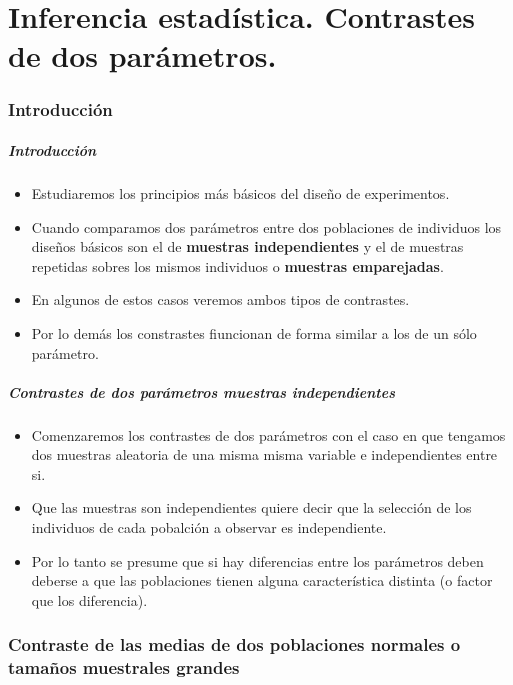 \part{Inferencia estadística. Contrastes de dos parámetros.}
\section{Introducción}

\begin{frame}
\frametitle{Introducción}

\begin{itemize}
\item Estudiaremos los principios más básicos del diseño de experimentos.
\item  Cuando comparamos dos parámetros entre dos poblaciones de individuos los diseños básicos son el de \textbf{muestras independientes} y el de muestras repetidas sobres los mismos individuos o \textbf{muestras emparejadas}.
\item En algunos de estos casos veremos ambos tipos de contrastes.
\item Por lo demás los constrastes fiuncionan de forma similar a los de un sólo parámetro.
\end{itemize}
\end{frame}
   

% 

\begin{frame}
\frametitle{Contrastes de dos parámetros muestras independientes}
\begin{itemize}
\item Comenzaremos los contrastes de dos parámetros con el caso en que tengamos dos muestras aleatoria de una misma misma variable e independientes entre si.
\item Que las muestras son independientes quiere decir que la selección de los individuos de cada pobalción a observar es independiente.
\item Por lo tanto se presume que si hay diferencias entre los parámetros deben deberse a que las poblaciones tienen alguna característica distinta (o factor que los diferencia).
\end{itemize}

\section{Contraste de las  medias de dos poblaciones normales o tamaños muestrales grandes}
\end{frame}

